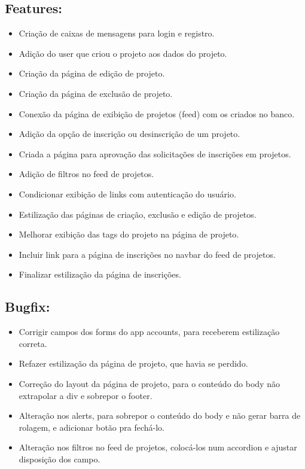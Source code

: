 \documentclass[
40pt,				%
openright,			%
oneside,			%
a4paper,			%
chapter=TITLE,		%
sumario=tradicional,
english,			%
]{abntex2}
\begin{document}
	\subsection*{\textbf{Features:}}
	\begin{itemize} \setlength\itemsep{0em}
		
		\item Criação de caixas de mensagens para login e registro.
		\item Adição do user que criou o projeto aos dados do projeto.
		\item Criação da página de edição de projeto.
		\item Criação da página de exclusão de projeto.
		\item Conexão da página de exibição de projetos (feed) com os criados no banco.
		\item Adição da opção de inscrição ou desinscrição de um projeto.
		\item Criada a página para aprovação das solicitações de inscrições em projetos.
		\item Adição de filtros no feed de projetos.
		\item Condicionar exibição de links com autenticação do usuário.
		\item Estilização das páginas de criação, exclusão e edição de projetos.
		\item Melhorar exibição das tags do projeto na página de projeto.
		\item Incluir link para a página de inscrições no navbar do feed de projetos.
		\item Finalizar estilização da página de inscrições.

	\end{itemize}

	\subsection*{\textbf{Bugfix:}}
	\begin{itemize} \setlength\itemsep{0em}

		\item Corrigir campos dos forms do app accounts, para receberem estilização correta.
		\item Refazer estilização da página de projeto, que havia se perdido.
		\item Correção do layout da página de projeto, para o conteúdo do body não extrapolar a div e sobrepor o footer.
		\item Alteração nos alerts, para sobrepor o conteúdo do body e não gerar barra de rolagem, e adicionar botão pra fechá-lo.
		\item Alteração nos filtros no feed de projetos, colocá-los num accordion e ajustar disposição dos campo.

	\end{itemize}
\end{document}
